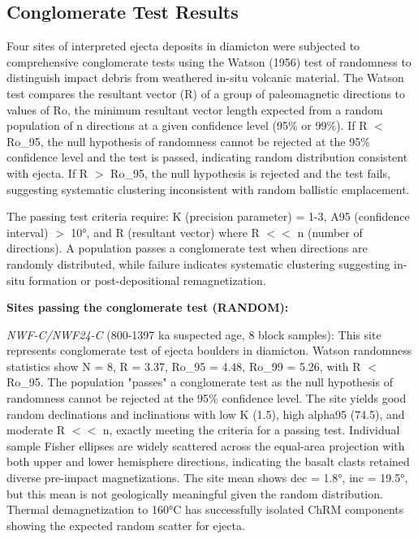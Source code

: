 \documentclass[twocolumn,11pt]{article}
\begin{document}
\subsection{Conglomerate Test Results}

Four sites of interpreted ejecta deposits in diamicton were subjected to comprehensive conglomerate tests using the Watson (1956) test of randomness to distinguish impact debris from weathered in-situ volcanic material. The Watson test compares the resultant vector (R) of a group of paleomagnetic directions to values of Ro, the minimum resultant vector length expected from a random population of n directions at a given confidence level (95\% or 99\%). If R $<$ Ro\_95, the null hypothesis of randomness cannot be rejected at the 95\% confidence level and the test is passed, indicating random distribution consistent with ejecta. If R $>$ Ro\_95, the null hypothesis is rejected and the test fails, suggesting systematic clustering inconsistent with random ballistic emplacement.

The passing test criteria require: K (precision parameter) = 1-3, A95 (confidence interval) $>$ 10°, and R (resultant vector) where R $<<$ n (number of directions). A population passes a conglomerate test when directions are randomly distributed, while failure indicates systematic clustering suggesting in-situ formation or post-depositional remagnetization.

\textbf{Sites passing the conglomerate test (RANDOM):}

\textit{NWF-C/NWF24-C} (800-1397 ka suspected age, 8 block samples): This site represents conglomerate test of ejecta boulders in diamicton. Watson randomness statistics show N = 8, R = 3.37, Ro\_95 = 4.48, Ro\_99 = 5.26, with R $<$ Ro\_95. The population "passes" a conglomerate test as the null hypothesis of randomness cannot be rejected at the 95\% confidence level. The site yields good random declinations and inclinations with low K (1.5), high alpha95 (74.5), and moderate R $<<$ n, exactly meeting the criteria for a passing test. Individual sample Fisher ellipses are widely scattered across the equal-area projection with both upper and lower hemisphere directions, indicating the basalt clasts retained diverse pre-impact magnetizations. The site mean shows dec = 1.8°, inc = 19.5°, but this mean is not geologically meaningful given the random distribution. Thermal demagnetization to 160°C has successfully isolated ChRM components showing the expected random scatter for ejecta.
\end{document}
